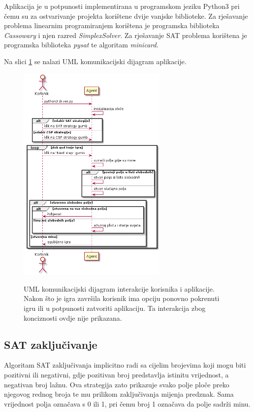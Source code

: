 \documentclass{article}
\numberwithin{figure}{section}
\numberwithin{table}{section}
\begin{document}
Aplikacija je u potpunosti implementirana u programskom jeziku Python3 pri čemu su za
ostvarivanje projekta korištene dvije vanjske biblioteke. Za rješavanje problema linearnim
programiranjem korištena je programska biblioteka \textit{Cassowary}\cite{badros2001cassowary} i njen razred
\textit{SimplexSolver}. Za rješavanje SAT problema korištena je programska biblioteka
\textit{pysat}\cite{ignatiev2018pysat} te algoritam \textit{minicard}\cite{liffiton2012cardinality}.

Na slici \ref{img:UML_komunikacijski} se nalazi UML komunikacijski dijagram aplikacije.

\begin{figure}[ht]
    \centering
    \includegraphics[width=0.65\textwidth]{images/seq_diagram.png}
    \label{img:UML_komunikacijski}
    \caption{UML komunikacijski dijagram interakcije korisnika i aplikacije. Nakon što je
    igra završila korisnik ima opciju ponovno pokrenuti igru ili u potpunosti zatvoriti
    aplikaciju. Ta interakcija zbog konciznosti ovdje nije prikazana.}
\end{figure}

\subsection{SAT zaključivanje}

Algoritam SAT zaključivanja implicitno radi sa cijelim brojevima koji mogu biti pozitivni ili negativni, gdje pozitivan broj predstavlja istinitu vrijednost, a negativan broj lažnu.
Ova strategija zato prikazuje svako polje ploče preko njegovog rednog broja te mu prilikom zaključivanja mijenja predznak. Sama vrijednost polja označava s 0 ili 1, pri čemu broj 1 označava da polje sadrži minu.
\end{document}
